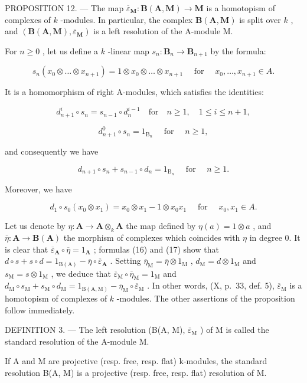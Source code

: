 PROPOSITION 12. --- The map \(\overline{\varepsilon}_{\mathbf{M}}: \mathbf{B}(\mathbf{A}, \mathbf{M}) \to \mathbf{M}\) is a homotopism of complexes of \(k\) -modules. In particular, the complex \(\mathbf{B}(\mathbf{A}, \mathbf{M})\) is split over \(k\) , and \((\mathbf{B}(\mathbf{A}, \mathbf{M}), \overline{\varepsilon}_{\mathbf{M}})\) is a left resolution of the A-module M.

For \(n \geqslant 0\) , let us define a \(k\) -linear map \(s_n: \mathbf{B}_n \to \mathbf{B}_{n+1}\) by the formula:

\[
s _ {n} \left(x _ {0} \otimes \dots \otimes x _ {n + 1}\right) = 1 \otimes x _ {0} \otimes \dots \otimes x _ {n + 1} \quad \text { for } \quad x _ {0}, \dots , x _ {n + 1} \in A.
\]

It is a homomorphism of right A-modules, which satisfies the identities:

\[
d _ {n + 1} ^ {i} \circ s _ {n} = s _ {n - 1} \circ d _ {n} ^ {i - 1} \quad \mathrm{for} \quad n \geqslant 1, \quad 1 \leqslant i \leqslant n + 1,
\]

\[
d _ {n + 1} ^ {0} \circ s _ {n} = 1 _ {\mathrm{B} _ {n}} \quad \text { for } \quad n \geqslant 1,
\]

and consequently we have

\[
d _ {n + 1} \circ s _ {n} + s _ {n - 1} \circ d _ {n} = 1 _ {\mathrm{B} _ {n}} \quad \text { for } \quad n \geqslant 1.\tag{16}
\]

Moreover, we have

\[
d _ {1} \circ s _ {0} (x _ {0} \otimes x _ {1}) = x _ {0} \otimes x _ {1} - 1 \otimes x _ {0} x _ {1} \quad \text { for } \quad x _ {0}, x _ {1} \in A.\tag{17}
\]

Let us denote by \(\eta: \mathbf{A} \to \mathbf{A} \otimes_k \mathbf{A}\) the map defined by \(\eta(a) = 1 \otimes a\) , and \(\overline{\eta}: \mathbf{A} \to \mathbf{B}(\mathbf{A})\) the morphism of complexes which coincides with \(\eta\) in degree 0. It is clear that \(\overline{\varepsilon}_{\mathbf{A}} \circ \overline{\eta} = 1_{\mathbf{A}}\) ; formulas (16) and (17) show that \(d \circ s + s \circ d = 1_{\mathrm{B(A)}} - \overline{\eta} \circ \overline{\varepsilon}_{\mathbf{A}}\) . Setting \(\overline{\eta}_{\mathrm{M}} = \overline{\eta} \otimes 1_{\mathrm{M}}\) , \(d_{\mathrm{M}} = d \otimes 1_{\mathrm{M}}\) and \(s_{\mathrm{M}} = s \otimes 1_{\mathrm{M}}\) , we deduce that \(\overline{\varepsilon}_{\mathrm{M}} \circ \overline{\eta}_{\mathrm{M}} = 1_{\mathrm{M}}\) and \(d_{\mathrm{M}} \circ s_{\mathrm{M}} + s_{\mathrm{M}} \circ d_{\mathrm{M}} = 1_{\mathrm{B(A,M)}} - \overline{\eta}_{\mathrm{M}} \circ \overline{\varepsilon}_{\mathrm{M}}\) . In other words, (X, p.~33, def. 5), \(\overline{\varepsilon}_{\mathrm{M}}\) is a homotopism of complexes of \(k\) -modules. The other assertions of the proposition follow immediately.

DEFINITION 3. --- The left resolution (B(A, M), \(\overline{\varepsilon}_{\mathrm{M}}\) ) of M is called the standard resolution of the A-module M.

If A and M are projective (resp. free, resp. flat) k-modules, the standard resolution B(A, M) is a projective (resp. free, resp. flat) resolution of M.

